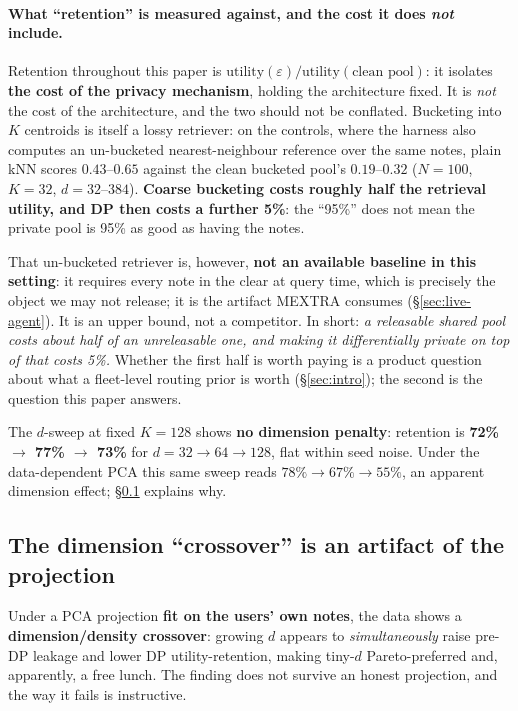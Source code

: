 \documentclass[pdflatex,sn-mathphys-num,12pt]{sn-jnl}
\theoremstyle{thmstyleone}%
\theoremstyle{thmstyletwo}%
\theoremstyle{thmstylethree}%
\newcommand{\eps}{\varepsilon}
\newcommand{\secref}[1]{\S\ref{#1}}
\begin{document}
\paragraph{What ``retention'' is measured against, and the cost it does \emph{not} include.}
Retention throughout this paper is $\mathrm{utility}(\eps) / \mathrm{utility}(\text{clean
pool})$: it isolates \textbf{the cost of the privacy mechanism}, holding the architecture
fixed. It is \emph{not} the cost of the architecture, and the two should not be conflated.
Bucketing into $K$ centroids is itself a lossy retriever: on the controls, where the harness
also computes an un-bucketed nearest-neighbour reference over the same notes, plain kNN scores
$0.43$--$0.65$ against the clean bucketed pool's $0.19$--$0.32$ ($N = 100$, $K = 32$,
$d = 32$--$384$). \textbf{Coarse bucketing costs roughly half the retrieval utility, and DP then
costs a further 5\%}: the ``95\%'' does not mean the private pool is 95\% as good as having the
notes.

That un-bucketed retriever is, however, \textbf{not an available baseline in this setting}: it
requires every note in the clear at query time, which is precisely the object we may not
release; it is the artifact MEXTRA consumes (\secref{sec:live-agent}). It is an upper bound,
not a competitor. In short: \emph{a releasable shared pool costs about
half of an unreleasable one, and making it differentially private on top of that costs 5\%.}
Whether the first half is worth paying is a product question about what a fleet-level routing
prior is worth (\secref{sec:intro}); the second is the question this paper answers.

The $d$-sweep at fixed $K = 128$ shows \textbf{no dimension penalty}: retention is
\textbf{72\% $\to$ 77\% $\to$ 73\%} for $d = 32 \to 64 \to 128$, flat within seed noise.
Under the data-dependent PCA this same sweep reads $78\% \to 67\% \to 55\%$, an apparent
dimension effect; \secref{sec:crossover} explains why.

\subsection{The dimension ``crossover'' is an artifact of the
projection}\label{sec:crossover}

Under a PCA projection \textbf{fit on the users' own notes}, the data shows a
\textbf{dimension/density crossover}: growing $d$ appears to \emph{simultaneously} raise
pre-DP leakage and lower DP utility-retention, making tiny-$d$ Pareto-preferred and,
apparently, a free lunch. The finding does not survive an honest projection, and the way
it fails is instructive.
\end{document}
